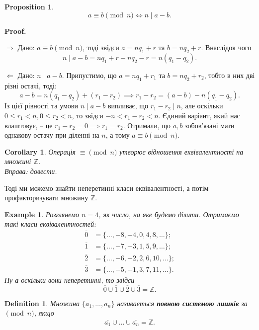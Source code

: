 \documentclass[a4paper, 10pt]{article}
\makeatletter
\theoremstyle{theoremdd}
\theoremstyle{theoremdd}
\newtheorem{definition}[theorem]{Definition}
\theoremstyle{theoremdd}
\theoremstyle{theoremdd}
\newtheorem{example}[theorem]{Example}
\theoremstyle{theoremdd}
\newtheorem{proposition}[theorem]{Proposition}
\theoremstyle{theoremdd}
\theoremstyle{theoremdd}
\theoremstyle{theoremdd}
\newtheorem{corollary}[theorem]{Corollary}
\def\rightproof{$\boxed{\Rightarrow}$ }
\def\leftproof{$\boxed{\Leftarrow}$ }
\renewenvironment{proof}[1][Proof.\\]{\par
\pushQED{\hfill \qed}%
\normalfont \topsep6\p@\@plus6\p@\relax
\trivlist
\item\relax
{\bfseries
#1\@addpunct{.}}\hspace\labelsep\ignorespaces
}{%
\popQED\endtrivlist\@endpefalse
}
\makeatother
\begin{document}
\begin{proposition}
\begin{equation*}
a \equiv b \pmod n \iff n \mid a-b.
\end{equation*}
\end{proposition}

\begin{proof}
\rightproof Дано: $a \equiv b \pmod n$, тоді звідси $a = nq_1 + r$ та $b = nq_2 + r$. Внаслідок чого
\[
n \mid a - b = nq_1 + r - nq_2 - r = n(q_1-q_2).
\]

\leftproof Дано: $n \mid a-b$. Припустимо, що $a = nq_1+r_1$ та $b = nq_2 + r_2$, тобто в них дві різні остачі, тоді:
\[
a - b = n(q_1-q_2) + (r_1-r_2) \implies r_1 - r_2 = (a-b) - n(q_1-q_2).
\]
Із цієї рівності та умови $n \mid a-b$ випливає, що $r_1 - r_2 \mid n$, але оскільки $0 \leq r_1 < n, 0 \leq r_2 < n$, то звідси $-n < r_1 - r_2 < n$. Єдиний варіант, який нас влаштовує, -- це $r_1 - r_2 = 0 \implies r_1 = r_2$. Отримали, що $a,b$ зобов'язані мати однакову остачу при діленні на $n$, а тому $a \equiv b \pmod n$.
\end{proof}

\begin{corollary}
Операція $\equiv \!\!\pmod n$ утворює відношення еквівалентності на множині $\mathbb{Z}$.\\
\textit{Вправа: довести.}
\end{corollary}

Тоді ми можемо знайти неперетинні класи еквівалентності, а потім профакторизувати множину $\mathbb{Z}$.

\begin{example}
Розглянемо $n = 4$, як число, на яке будемо ділити. Отримаємо такі класи еквівалентностей:
\begin{align*}
\overline{0} & = \{\dots,-8,-4,0,4,8,\dots\};\\
\overline{1} & = \{\dots,-7,-3,1,5,9,\dots\};\\
\overline{2} & = \{\dots,-6,-2,2,6,10,\dots\};\\
\overline{3} & = \{\dots,-5,-1,3,7,11,\dots\}.
\end{align*}
Ну а оскільки вони неперетинні, то звідси 
\[
\overline{0} \cup \overline{1} \cup \overline{2} \cup \overline{3} = \mathbb{Z}.
\]
\end{example}

\begin{definition}
Множина $\{a_1,\dots,a_n\}$ називається \textbf{повною системою лишків} за $\!\! \pmod n$, якщо
\begin{align*}
\overline{a_1} \cup \dots \cup \overline{a_n} = \mathbb{Z}.
\end{align*}
\end{definition}
\end{document}
